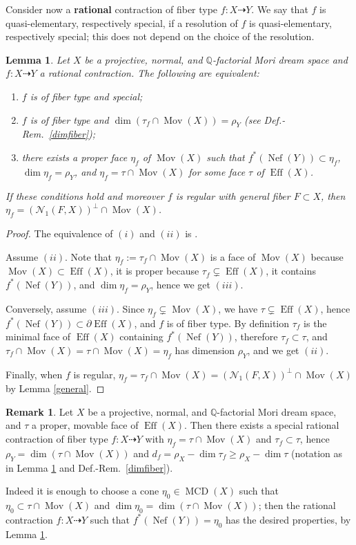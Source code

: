 \documentclass[a4paper,12pt]{amsart}
\newtheorem{lemma}[thm]{Lemma}
\theoremstyle{definition}
\newtheorem{remark}[thm]{Remark}
\numberwithin{figure}{section}
\numberwithin{table}{section}
\newcommand{\Q}{\mathbb{Q}}
\newcommand{\N}{\mathcal{N}_1}
\newcommand{\Eff}{\operatorname{Eff}}
\newcommand{\Nef}{\operatorname{Nef}}
\newcommand{\Mov}{\operatorname{Mov}}
\newcommand{\MCD}{\operatorname{MCD}}
\begin{document}
\medskip

Consider now a {\bf rational} contraction of fiber type $f\colon X\dasharrow Y$. We say that $f$ is quasi-elementary, respectively special, if a resolution
of $f$ is quasi-elementary, respectively special; this does not depend on the choice of the resolution.
\begin{lemma}\label{eubea}
  Let $X$ be a projective, normal, and $\Q$-factorial Mori dream space and $f\colon X\dasharrow Y$ a rational contraction. The following are equivalent:
  \begin{enumerate}[$(i)$]
  \item  $f$ is of fiber type and special;
 \item $f$ is of fiber type and   $\dim(\tau_f\cap\Mov(X))=\rho_Y$ (see Def.-Rem.~\ref{dimfiber});
  \item there exists a proper face $\eta_f$ of $\Mov(X)$ such that 
    $f^*(\Nef(Y))\subset\eta_f$, $\dim\eta_f=\rho_Y$, and $\eta_f=\tau\cap \Mov(X)$ for some face $\tau$ of $\Eff(X)$.
  \end{enumerate}
  
  If these conditions hold and moreover $f$ is regular with general fiber $F\subset X$, then $\eta_f=(\N(F,X))^{\perp}\cap\Mov(X)$.
\end{lemma}
\begin{proof}
The equivalence of $(i)$ and $(ii)$  is \cite[Lemma 5.3]{small}.
  
  Assume  $(ii)$. Note that $\eta_f:=\tau_f\cap\Mov(X)$ is a face of $\Mov(X)$ because $\Mov(X)\subset\Eff(X)$, it is proper because $\tau_f\subsetneq\Eff(X)$, it contains $f^*(\Nef(Y))$, and $\dim\eta_f=\rho_Y$, hence we get $(iii)$.

  Conversely, assume $(iii)$. Since $\eta_f\subsetneq\Mov(X)$, we have $\tau\subsetneq\Eff(X)$, hence $f^*(\Nef(Y))\subset\partial\Eff(X)$, and $f$ is of fiber type.
  By definition $\tau_f$ is the minimal face of $\Eff(X)$ containing $f^*(\Nef(Y))$, therefore $\tau_f\subset\tau$, and $\tau_f\cap \Mov(X)=\tau\cap \Mov(X)=\eta_f$ has dimension $\rho_Y$, and we get $(ii)$.

  Finally, when $f$ is regular, $\eta_f=\tau_f\cap \Mov(X)=(\N(F,X))^{\perp}\cap\Mov(X)$ by Lemma \ref{general}.
\end{proof}
\begin{remark}\label{zumba}
  Let $X$ be a projective, normal, and $\Q$-factorial Mori dream space, and  $\tau$  a proper, movable face of $\Eff(X)$. Then there exists a special rational contraction of fiber type $f\colon X\dasharrow Y$ with $\eta_f=\tau\cap\Mov(X)$ and $\tau_f\subset\tau$, hence $\rho_Y=\dim(\tau\cap\Mov(X))$ and $d_f=\rho_X-\dim\tau_f\geq\rho_X-\dim\tau$ (notation as in Lemma \ref{eubea} and Def.-Rem.~\ref{dimfiber}).

  Indeed it is enough to choose a cone $\eta_0\in\MCD(X)$ such that $\eta_0\subset
  \tau\cap\Mov(X)$ and $\dim\eta_0=\dim(\tau\cap\Mov(X))$; then the rational contraction $f\colon X\dasharrow Y$ such that $f^*(\Nef(Y))=\eta_0$  
 has the desired properties, by Lemma \ref{eubea}.
\end{remark}  
\end{document}
